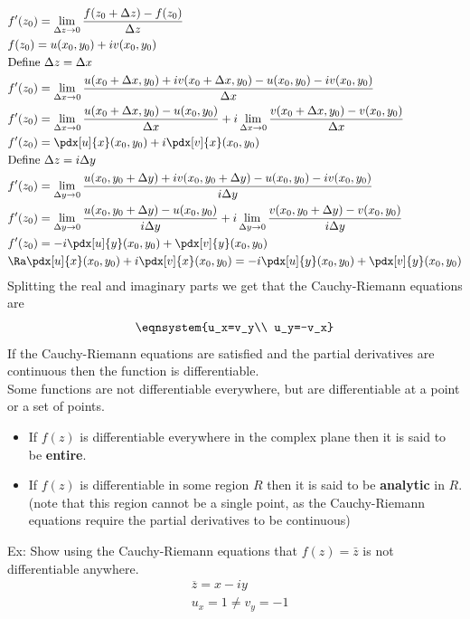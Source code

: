 \begin{align*}
    &f'(z_0)=\lim_{\Delta z\to0}\frac{f(z_0+\Delta z)-f(z_0)}{\Delta z}\\
    &f(z_0)=u(x_0,y_0)+iv(x_0,y_0)\\
    &\text{Define }\Delta z=\Delta x\\
    &f'(z_0)=\lim_{\Delta x\to 0}\frac{u(x_0+\Delta x, y_0)+iv(x_0+\Delta x, y_0)-u(x_0,y_0)-iv(x_0,y_0)}{\Delta x}\\
    &f'(z_0)=\lim_{\Delta x\to 0}\frac{u(x_0+\Delta x, y_0)-u(x_0,y_0)}{\Delta x}+i\lim_{\Delta x\to 0}\frac{v(x_0+\Delta x, y_0)-v(x_0,y_0)}{\Delta x}\\
    &f'(z_0)=\pdx[u]{x}(x_0,y_0)+i\pdx[v]{x}(x_0,y_0)\\
    &\text{Define }\Delta z=i\Delta y\\
    &f'(z_0)=\lim_{\Delta y\to 0}\frac{u(x_0, y_0+\Delta y)+iv(x_0, y_0+\Delta y)-u(x_0,y_0)-iv(x_0,y_0)}{i\Delta y}\\
    &f'(z_0)=\lim_{\Delta y\to 0}\frac{u(x_0, y_0+\Delta y)-u(x_0,y_0)}{i\Delta y}+i\lim_{\Delta y\to 0}\frac{v(x_0, y_0+\Delta y)-v(x_0,y_0)}{i\Delta y}\\
    &f'(z_0)=-i\pdx[u]{y}(x_0,y_0)+\pdx[v]{y}(x_0,y_0)\\
    &\Ra\pdx[u]{x}(x_0,y_0)+i\pdx[v]{x}(x_0,y_0)=-i\pdx[u]{y}(x_0,y_0)+\pdx[v]{y}(x_0,y_0)
\end{align*}
Splitting the real and imaginary parts we get that the Cauchy-Riemann equations are
$$\eqnsystem{u_x=v_y\\ u_y=-v_x}$$
If the Cauchy-Riemann equations are satisfied and the partial derivatives are continuous then the function is differentiable.\\
Some functions are not differentiable everywhere, but are differentiable at a point or a set of points.\\
\begin{itemize}
    \item If $f(z)$ is differentiable everywhere in the complex plane then it is said to be \textbf{entire}.
    \item If $f(z)$ is differentiable in some region $R$ then it is said to be \textbf{analytic} in $R$.\\
    (note that this region cannot be a single point, as the Cauchy-Riemann equations require the partial derivatives to be continuous)
\end{itemize}
Ex: Show using the Cauchy-Riemann equations that $f(z)=\bar{z}$ is not differentiable anywhere.
\begin{align*}
    &\overline{z}=x-iy\\
    &u_x=1\neq v_y=-1
\end{align*}
